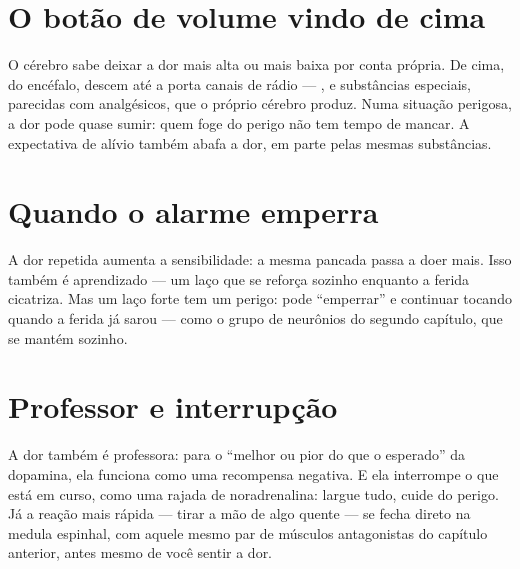 \section*{O botão de volume vindo de cima}

O cérebro sabe deixar a dor mais alta ou mais baixa por conta própria. De cima, do encéfalo, descem até a porta canais de rádio --- ,  e substâncias especiais, parecidas com analgésicos, que o próprio cérebro produz. Numa situação perigosa, a dor pode quase sumir: quem foge do perigo não tem tempo de mancar. A expectativa de alívio também abafa a dor, em parte pelas mesmas substâncias.

\section*{Quando o alarme emperra}

A dor repetida aumenta a sensibilidade: a mesma pancada passa a doer mais. Isso também é aprendizado --- um laço que se reforça sozinho enquanto a ferida cicatriza. Mas um laço forte tem um perigo: pode ``emperrar'' e continuar tocando quando a ferida já sarou --- como o grupo de neurônios do segundo capítulo, que se mantém sozinho.

\section*{Professor e interrupção}

A dor também é professora: para o ``melhor ou pior do que o esperado'' da dopamina, ela funciona como uma recompensa negativa. E ela interrompe o que está em curso, como uma rajada de noradrenalina: largue tudo, cuide do perigo. Já a reação mais rápida --- tirar a mão de algo quente --- se fecha direto na medula espinhal, com aquele mesmo par de músculos antagonistas do capítulo anterior, antes mesmo de você sentir a dor.

